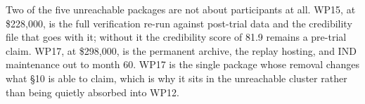 Two of the five unreachable packages are not about participants at all. WP15,
at \$228,000, is the full verification re-run against post-trial data and the
credibility file that goes with it; without it the credibility score of 81.9
remains a pre-trial claim. WP17, at \$298,000, is the permanent archive, the
replay hosting, and IND maintenance out to month 60. WP17 is the single package
whose removal changes what \S10 is able to claim, which is why it sits in the
unreachable cluster rather than being quietly absorbed into WP12.
